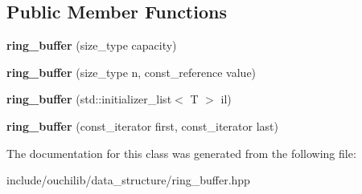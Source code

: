 \subsection*{Public Member Functions}
\begin{DoxyCompactItemize}
\item 
\mbox{\label{classouchi_1_1ring__buffer_a348732f11c6e541402199164210b7bff}} 
{\bfseries ring\+\_\+buffer} (size\+\_\+type capacity)
\item 
\mbox{\label{classouchi_1_1ring__buffer_a23e4c3c6dbb6b701a44b5539bcb782a0}} 
{\bfseries ring\+\_\+buffer} (size\+\_\+type n, const\+\_\+reference value)
\item 
\mbox{\label{classouchi_1_1ring__buffer_a60ab940439e1ced3f55c016724693c1c}} 
{\bfseries ring\+\_\+buffer} (std\+::initializer\+\_\+list$<$ T $>$ il)
\item 
\mbox{\label{classouchi_1_1ring__buffer_a13771d85cd8310d02b7a762cc9e3f1a9}} 
{\bfseries ring\+\_\+buffer} (const\+\_\+iterator first, const\+\_\+iterator last)
\end{DoxyCompactItemize}


The documentation for this class was generated from the following file\+:\begin{DoxyCompactItemize}
\item 
include/ouchilib/data\+\_\+structure/ring\+\_\+buffer.\+hpp\end{DoxyCompactItemize}
